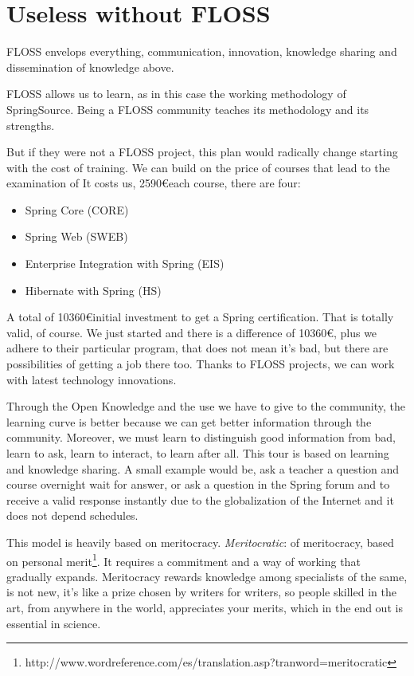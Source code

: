 \documentclass[11pt]{scrartcl}
\begin{document}
\section{Useless without FLOSS}

\par FLOSS envelops everything, communication, innovation, knowledge sharing and dissemination of knowledge above.

\par FLOSS allows us to learn, as in this case the working methodology of SpringSource. Being a FLOSS community teaches its methodology and its strengths.

\par But if they were not a FLOSS project, this plan would radically change starting with the cost of training. We can build on the price of courses that lead to the examination of It costs us, 2590\euro each course, there are four:

\begin{itemize}
    \item Spring Core (CORE)
    \item Spring Web (SWEB)
    \item Enterprise Integration with Spring (EIS)
    \item Hibernate with Spring (HS)
\end{itemize}

\par A total of 10360\euro initial investment to get a Spring certification. That is totally valid, of course. We just started and there is a difference of 10360\euro, plus we adhere to their particular program, that does not mean it's bad, but there are possibilities of getting a job there too. Thanks to FLOSS projects, we can work with latest technology innovations.

\par Through the Open Knowledge and the use we have to give to the community, the learning curve is better because we can get better information through the community. Moreover, we must learn to distinguish good information from bad, learn to ask, learn to interact, to learn after all. This tour is based on learning and knowledge sharing. A small example would be, ask a teacher a question and course overnight wait for answer, or ask a question in the Spring forum and to receive a valid response instantly due to the globalization of the Internet and it does not depend schedules.

\par This model is heavily based on meritocracy. \emph{Meritocratic}: of meritocracy, based on personal merit\footnote {http://www.wordreference.com/es/translation.asp?tranword=meritocratic}. It requires a commitment and a way of working that gradually expands. Meritocracy rewards knowledge among specialists of the same, is not new, it's like a prize chosen by writers for writers, so people skilled in the art, from anywhere in the world, appreciates your merits, which in the end out is essential in science.
\end{document}
